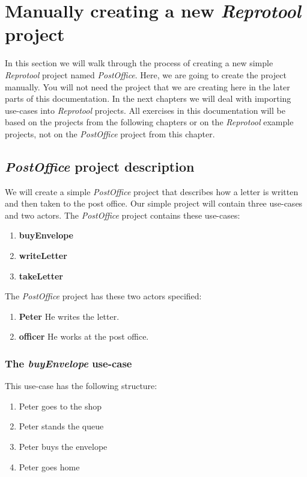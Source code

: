 \section{Manually creating a new \emph{Reprotool} project}

In this section we will walk through the process of creating a new simple \emph{Reprotool} project named \emph{PostOffice}.
Here, we are going to create the project manually. You will not need the project that we are creating here in the later parts
of this documentation. In the next chapters we will deal with importing use-cases into \emph{Reprotool} projects.
All exercises in this documentation will be based on the projects from the following chapters or on the \emph{Reprotool} example projects,
not on the \emph{PostOffice} project from this chapter.

\subsection{\emph{PostOffice} project description}
We will create a simple \emph{PostOffice} project that describes how a letter is written and then taken to the post office.
Our simple project will contain three use-cases and two actors. The \emph{PostOffice} project contains these use-cases:

\begin{enumerate}
 \item {\bf buyEnvelope}
 \item {\bf writeLetter}
 \item {\bf takeLetter}
\end{enumerate}

The \emph{PostOffice} project has these two actors specified:

\begin{enumerate}
 \item {\bf Peter} He writes the letter.
 \item {\bf officer} He works at the post office.
\end{enumerate}

\subsubsection{The \emph{buyEnvelope} use-case}

This use-case has the following structure:

\begin{enumerate}
 \item Peter goes to the shop
 \item Peter stands the queue
 \item Peter buys the envelope
 \item Peter goes home
\end{enumerate}

